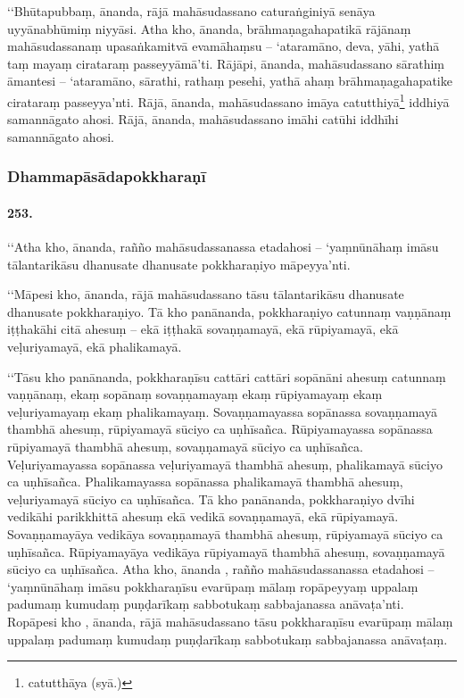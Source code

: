 ‘‘Bhūtapubbaṃ, ānanda, rājā mahāsudassano caturaṅginiyā senāya uyyānabhūmiṃ niyyāsi. Atha kho, ānanda, brāhmaṇagahapatikā rājānaṃ mahāsudassanaṃ upasaṅkamitvā evamāhaṃsu – ‘ataramāno, deva, yāhi, yathā taṃ mayaṃ cirataraṃ passeyyāmā’ti. Rājāpi, ānanda, mahāsudassano sārathiṃ āmantesi – ‘ataramāno, sārathi, rathaṃ pesehi, yathā ahaṃ brāhmaṇagahapatike cirataraṃ passeyya’nti. Rājā, ānanda, mahāsudassano imāya catutthiyā\footnote{catutthāya (syā.)} iddhiyā samannāgato ahosi. Rājā, ānanda, mahāsudassano imāhi catūhi iddhīhi samannāgato ahosi.

\subsubsection{Dhammapāsādapokkharaṇī}

\paragraph{253.} ‘‘Atha kho, ānanda, rañño mahāsudassanassa etadahosi – ‘yaṃnūnāhaṃ imāsu tālantarikāsu dhanusate dhanusate pokkharaṇiyo māpeyya’nti.

‘‘Māpesi kho, ānanda, rājā mahāsudassano tāsu tālantarikāsu dhanusate dhanusate pokkharaṇiyo. Tā kho panānanda, pokkharaṇiyo catunnaṃ vaṇṇānaṃ iṭṭhakāhi citā ahesuṃ – ekā iṭṭhakā sovaṇṇamayā, ekā rūpiyamayā, ekā veḷuriyamayā, ekā phalikamayā.

‘‘Tāsu kho panānanda, pokkharaṇīsu cattāri cattāri sopānāni ahesuṃ catunnaṃ vaṇṇānaṃ, ekaṃ sopānaṃ sovaṇṇamayaṃ ekaṃ rūpiyamayaṃ ekaṃ veḷuriyamayaṃ ekaṃ phalikamayaṃ. Sovaṇṇamayassa sopānassa sovaṇṇamayā thambhā ahesuṃ, rūpiyamayā sūciyo ca uṇhīsañca. Rūpiyamayassa sopānassa rūpiyamayā thambhā ahesuṃ, sovaṇṇamayā sūciyo ca uṇhīsañca. Veḷuriyamayassa sopānassa veḷuriyamayā thambhā ahesuṃ, phalikamayā sūciyo ca uṇhīsañca. Phalikamayassa sopānassa phalikamayā thambhā ahesuṃ, veḷuriyamayā sūciyo ca uṇhīsañca. Tā kho panānanda, pokkharaṇiyo dvīhi vedikāhi parikkhittā ahesuṃ ekā vedikā sovaṇṇamayā, ekā rūpiyamayā. Sovaṇṇamayāya vedikāya sovaṇṇamayā thambhā ahesuṃ, rūpiyamayā sūciyo ca uṇhīsañca. Rūpiyamayāya vedikāya rūpiyamayā thambhā ahesuṃ, sovaṇṇamayā sūciyo ca uṇhīsañca. Atha kho, ānanda , rañño mahāsudassanassa etadahosi – ‘yaṃnūnāhaṃ imāsu pokkharaṇīsu evarūpaṃ mālaṃ ropāpeyyaṃ uppalaṃ padumaṃ kumudaṃ puṇḍarīkaṃ sabbotukaṃ sabbajanassa anāvaṭa’nti. Ropāpesi kho , ānanda, rājā mahāsudassano tāsu pokkharaṇīsu evarūpaṃ mālaṃ uppalaṃ padumaṃ kumudaṃ puṇḍarīkaṃ sabbotukaṃ sabbajanassa anāvaṭaṃ.

